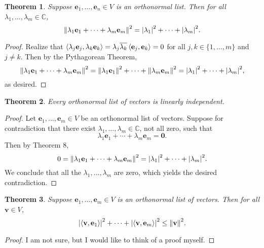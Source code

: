 \documentclass[11pt]{article}
\renewcommand{\vec}[1]{\mathbf{#1}}
\newcommand{\conjugate}[1]{\overline{#1}}
\newtheorem{theorem}{Theorem}
\begin{document}
\begin{theorem}
	Suppose $\vec{e}_{1}, \ldots, \vec{e}_{n} \in V$ is an orthonormal list. Then for all $\lambda_{1}, \ldots, \lambda_{m} \in \mathbb{C}$,
	\[
		\norm{\lambda_{1} \vec{e}_{1} + \cdots + \lambda_{m} \vec{e}_{m}}^{2} = \abs{\lambda_{1}}^{2} + \cdots + \abs{\lambda_{m}}^{2}.
	\]
\end{theorem}
\begin{adjustwidth}{1cm}{}
	\begin{proof}
		Realize that $\ev{\lambda_{j} \vec{e}_{j}, \lambda_{k} \vec{e}_{k}} = \lambda_{j} \conjugate{\lambda_{k}} \ev{\vec{e}_{j}, \vec{e}_{k}} = 0$ for all $j, k \in \{ 1, \ldots, m \}$ and $j \ne k$. Then by the Pythagorean Theorem,
		\[
			\norm{\lambda_{1} \vec{e}_{1} + \cdots + \lambda_{m} \vec{e}_{m}}^{2} = \norm{\lambda_{1} \vec{e}_{1}}^{2} + \cdots + \norm{\lambda_{m} \vec{e}_{m}}^{2} = \abs{\lambda_{1}}^{2} + \cdots + \abs{\lambda_{m}}^{2},
		\]
		as desired.
	\end{proof}
\end{adjustwidth}

\begin{theorem}
	Every orthonormal list of vectors is linearly independent.
\end{theorem}
\begin{adjustwidth}{1cm}{}
	\begin{proof}
		Let $\vec{e}_{1}, \ldots, \vec{e}_{m} \in V$ be an orthonormal list of vectors. Suppose for contradiction that there exist $\lambda_{1}, \ldots, \lambda_{m} \in \mathbb{C}$, not all zero, such that
		\[
			\lambda_{1} \vec{e}_{1} + \cdots + \lambda_{m} \vec{e}_{m} = \vec{0}.
		\]
		Then by Theorem 8, 
		\[
			0 = \norm{\lambda_{1} \vec{e}_{1} + \cdots + \lambda_{m} \vec{e}_{m}}^{2} = \abs{\lambda_{1}}^{2} + \cdots + \abs{\lambda_{m}}^{2}.
		\]
		We conclude that all the $\lambda_{1}, \ldots, \lambda_{m}$ are zero, which yields the desired contradiction.
	\end{proof}
\end{adjustwidth}

\begin{theorem}
	Suppose $\vec{e}_{1}, \ldots, \vec{e}_{m} \in V$ is an orthonormal list of vectors. Then for all $\vec{v} \in V$,
	\[
		\abs{\ev{\vec{v}, \vec{e}_{1}}}^{2} + \cdots + \abs{\ev{\vec{v}, \vec{e}_{m}}}^{2} \le \norm{\vec{v}}^{2}.
	\]
\end{theorem}
\begin{adjustwidth}{1cm}{}
	\begin{proof}
		I am not sure, but I would like to think of a proof myself.
	\end{proof}
\end{adjustwidth}
\end{document}
